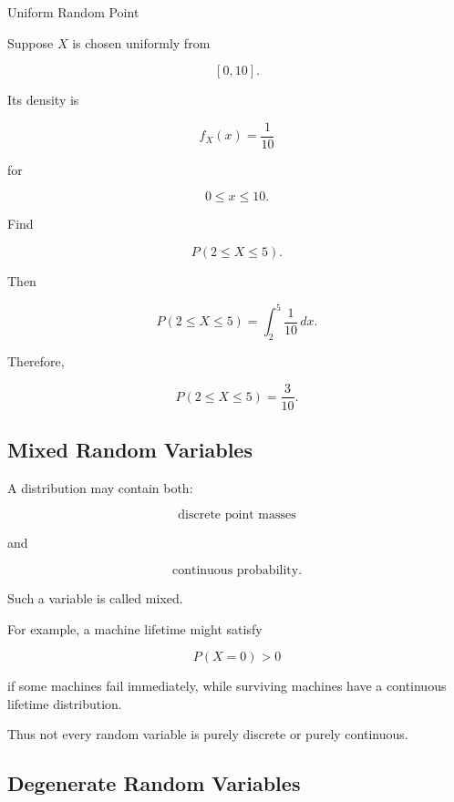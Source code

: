 \begin{workedexamplebox}{Uniform Random Point}

Suppose \(X\) is chosen uniformly from

\[
[0,10].
\]

Its density is

\[
f_X(x)
=
\frac1{10}
\]

for

\[
0\leq x\leq10.
\]

Find

\[
P(2\leq X\leq5).
\]

Then

\[
P(2\leq X\leq5)
=
\int_2^5\frac1{10}\,dx.
\]

Therefore,

\begin{answerbox}
\[
\boxed{
P(2\leq X\leq5)
=
\frac3{10}.
}
\]
\end{answerbox}

\end{workedexamplebox}

\subsection{Mixed Random Variables}
\label{subsec:mixed-random-variables}

A distribution may contain both:

\[
\text{discrete point masses}
\]

and

\[
\text{continuous probability}.
\]

Such a variable is called mixed.

For example, a machine lifetime might satisfy

\[
P(X=0)>0
\]

if some machines fail immediately, while surviving machines have a
continuous lifetime distribution.

Thus not every random variable is purely discrete or purely continuous.

\subsection{Degenerate Random Variables}
\label{subsec:degenerate-random-variables}

